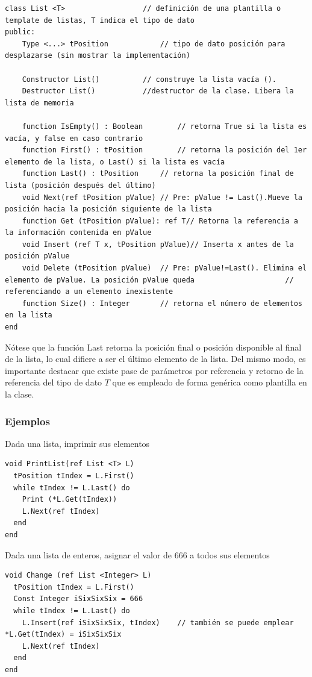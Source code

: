 \begin{lstlisting}[upquote=true, language=pseudo]
class List <T>					// definición de una plantilla o template de listas, T indica el tipo de dato
public:
    Type <...> tPosition			// tipo de dato posición para desplazarse (sin mostrar la implementación)

    Constructor List()			// construye la lista vacía ().
    Destructor List()			//destructor de la clase. Libera la lista de memoria

    function IsEmpty() : Boolean		// retorna True si la lista es vacía, y false en caso contrario
    function First() : tPosition		// retorna la posición del 1er elemento de la lista, o Last() si la lista es vacía
    function Last() : tPosition		// retorna la posición final de lista (posición después del último)
    void Next(ref tPosition pValue)	// Pre: pValue != Last().Mueve la posición hacia la posición siguiente de la lista
    function Get (tPosition pValue): ref T// Retorna la referencia a la información contenida en pValue
    void Insert (ref T x, tPosition pValue)// Inserta x antes de la posición pValue
    void Delete (tPosition pValue)	// Pre: pValue!=Last(). Elimina el elemento de pValue. La posición pValue queda						// referenciando a un elemento inexistente
    function Size() : Integer		// retorna el número de elementos en la lista
end
\end{lstlisting}

Nótese que la función Last retorna la posición final o posición disponible al final de la lista, lo cual difiere a ser el último elemento de la lista. Del mismo modo, es importante destacar que existe pase de parámetros por referencia y retorno de la referencia del tipo de dato $T$ que es empleado de forma genérica como plantilla en la clase.

\subsubsection{Ejemplos}

Dada una lista, imprimir sus elementos
\begin{lstlisting}[upquote=true, language=pseudo]
void PrintList(ref List <T> L)
  tPosition tIndex = L.First()
  while tIndex != L.Last() do
    Print (*L.Get(tIndex))
    L.Next(ref tIndex)
  end
end
\end{lstlisting}

Dada una lista de enteros, asignar el valor de 666 a todos sus elementos
\begin{lstlisting}[upquote=true, language=pseudo]
void Change (ref List <Integer> L)
  tPosition tIndex = L.First()
  Const Integer iSixSixSix = 666
  while tIndex != L.Last() do
    L.Insert(ref iSixSixSix, tIndex) 	// también se puede emplear *L.Get(tIndex) = iSixSixSix
    L.Next(ref tIndex)
  end
end
\end{lstlisting}

